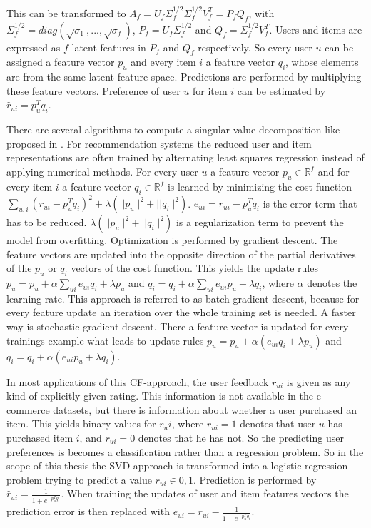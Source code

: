 \documentclass[10pt]{reportMaster}
\begin{document}
This can be transformed to $A_f = U_f \Sigma_f^{1/2} \Sigma_f^{1/2} V_f^T = P_f Q_f$, with $\Sigma_f^{1/2} = diag(\sqrt{\sigma_1}, ..., \sqrt{\sigma_f})$, $P_f = U_f \Sigma_f^{1/2}$ and $Q_f = \Sigma_f^{1/2} V_f^T$.
Users and items are expressed as $f$ latent features in $P_f$ and $Q_f$ respectively.
So every user $u$ can be assigned a feature vector $p_u$ and every item $i$ a feature vector $q_i$, whose elements are from the same latent feature space.
Predictions are performed by multiplying these feature vectors.
Preference of user $u$ for item $i$ can be estimated by $\hat{r}_{ui} = p_u^T q_i$.

There are several algorithms to compute a singular value decomposition like proposed in \cite{svdGolubSolution}.
For recommendation systems the reduced user and item representations are often trained by alternating least squares regression instead of applying numerical methods. %
For every user $u$ a feature vector $p_u \in \mathds{R}^f$ and for every item $i$ a feature vector $q_i \in \mathds{R}^f$ is learned by minimizing the cost function $\sum_{u, i}{(r_{ui} - p_u^T q_i)^2 + \lambda (||p_u||^2 + ||q_i||^2)}$.
$e_{ui} = r_{ui} - p_u^T q_i$ is the error term that has to be reduced.
$\lambda (||p_u||^2 + ||q_i||^2)$ is a regularization term to prevent the model from overfitting.
Optimization is performed by gradient descent.
The feature vectors are updated into the opposite direction of the partial derivatives of the $p_u$ or $q_i$ vectors of the cost function.
This yields the update rules $p_u = p_u + \alpha \sum_{ui}{e_{ui} q_i + \lambda p_u}$ and $q_i = q_i + \alpha \sum_{ui}{e_{ui} p_u + \lambda q_i}$, where $\alpha$ denotes the learning rate.
This approach is referred to as batch gradient descent, because for every feature update an iteration over the whole training set is needed.
A faster way is stochastic gradient descent. %
There a feature vector is updated for every trainings example what leads to update rules $p_u = p_u + \alpha (e_{ui} q_i + \lambda p_u)$ and $q_i = q_i + \alpha (e_{ui} p_u + \lambda q_i)$.

In most applications of this CF-approach, the user feedback $r_{ui}$ is given as any kind of explicitly given rating.
This information is not available in the e-commerce datasets, but there is information about whether a user purchased an item.
This yields binary values for $r_ui$, where $r_{ui} = 1$ denotes that user $u$ has purchased item $i$, and $r_{ui} = 0$ denotes that he has not.
So the predicting user preferences is becomes a classification rather than a regression problem.
So in the scope of this thesis the SVD approach is transformed into a logistic regression problem trying to predict a value $r_{ui} \in {0,1}$.
Prediction is performed by $\hat{r}_{ui} = \frac{1}{1 + e^{-p_u^Tq_i}}$.
When training the updates of user and item features vectors the prediction error is then replaced with $e_{ui} = r_{ui} - \frac{1}{1 + e^{-p_u^Tq_i}}$.
\end{document}
